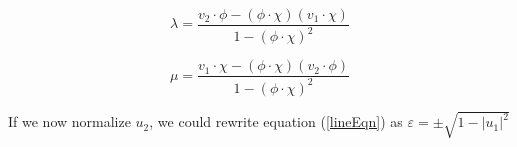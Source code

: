 \begin{equation}
    \lambda =
    \frac{v_2\cdot\phi-(\phi\cdot\chi)(v_1\cdot\chi)}{1-(\phi\cdot\chi)^2}
\end{equation}

\begin{equation}
    \mu =
    \frac{v_1\cdot\chi-(\phi\cdot\chi)(v_2\cdot\phi)}{1-(\phi\cdot\chi)^2}
\end{equation}

If we now normalize $u_2$, we could rewrite equation (\ref{lineEqn}) as
$\varepsilon=\pm\sqrt{1-|u_1|^2}$

